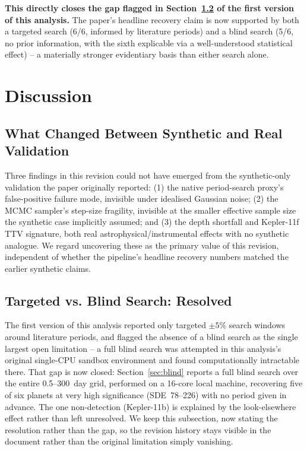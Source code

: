 \documentclass[11pt]{article}
\begin{document}
\textbf{This directly closes the gap flagged in Section~\ref{sec:targeted-vs-blind} of the first version of this analysis.} The paper's headline recovery claim is now supported by both a targeted search (6/6, informed by literature periods) and a blind search (5/6, no prior information, with the sixth explicable via a well-understood statistical effect) -- a materially stronger evidentiary basis than either search alone.

\section{Discussion}

\subsection{What Changed Between Synthetic and Real Validation}

Three findings in this revision could not have emerged from the synthetic-only validation the paper originally reported: (1) the native period-search proxy's false-positive failure mode, invisible under idealised Gaussian noise; (2) the MCMC sampler's step-size fragility, invisible at the smaller effective sample size the synthetic case implicitly assumed; and (3) the depth shortfall and Kepler-11f TTV signature, both real astrophysical/instrumental effects with no synthetic analogue. We regard uncovering these as the primary value of this revision, independent of whether the pipeline's headline recovery numbers matched the earlier synthetic claims.

\subsection{Targeted vs. Blind Search: Resolved}
\label{sec:targeted-vs-blind}

The first version of this analysis reported only targeted $\pm5\%$ search windows around literature periods, and flagged the absence of a blind search as the single largest open limitation -- a full blind search was attempted in this analysis's original single-CPU sandbox environment and found computationally intractable there. That gap is now closed: Section~\ref{sec:blind} reports a full blind search over the entire 0.5--300~day grid, performed on a 16-core local machine, recovering five of six planets at very high significance (SDE~78--226) with no period given in advance. The one non-detection (Kepler-11b) is explained by the look-elsewhere effect rather than left unresolved. We keep this subsection, now stating the resolution rather than the gap, so the revision history stays visible in the document rather than the original limitation simply vanishing.
\end{document}
